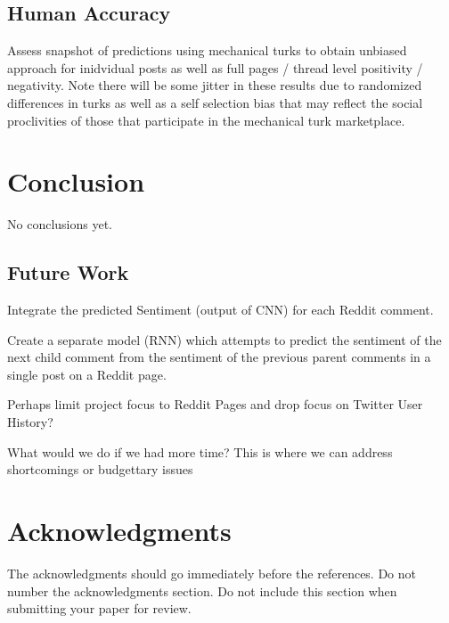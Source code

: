 \documentclass[11pt]{article}
\begin{document}
\subsection{Human Accuracy}

Assess snapshot of predictions using mechanical turks to obtain unbiased 
approach for inidvidual posts as well as full pages / thread level positivity 
/ negativity. Note there will be some jitter in these results due to randomized 
differences in turks as well as a self selection bias that may reflect the social 
proclivities of those that participate in the mechanical turk marketplace.

\section{Conclusion}

No conclusions yet.

\subsection{Future Work}

Integrate the predicted Sentiment (output of CNN) for each Reddit comment.

Create a separate model (RNN) which attempts to predict the sentiment of 
the next child comment from the sentiment of the previous parent comments 
in a single post on a Reddit page. 

Perhaps limit project focus to Reddit Pages and drop focus on Twitter User History?

What would we do if we had more time? This is where we can address shortcomings 
or budgettary issues

\section*{Acknowledgments}

The acknowledgments should go immediately before the references.  Do
not number the acknowledgments section. Do not include this section
when submitting your paper for review.

%
%
\end{document}
